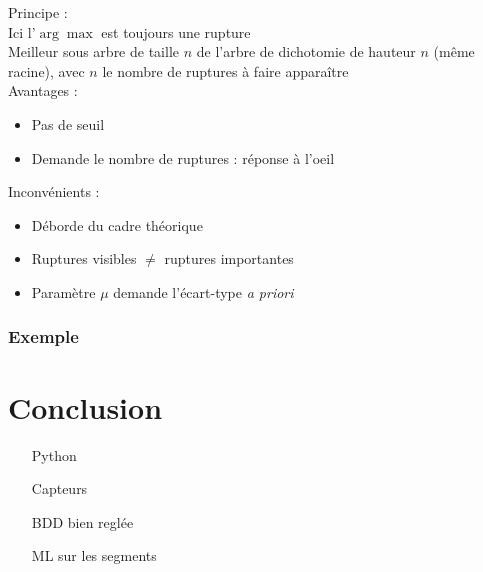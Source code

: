 \documentclass{beamer}
\begin{document}
\begin{frame}

	Principe :
	\vspace{.25cm}
	\\
	Ici l'$\arg\max$ est toujours une rupture
	\\
	Meilleur sous arbre de taille $n$ de l'arbre de dichotomie de hauteur $n$ (même racine), avec $n$ le nombre de ruptures à faire apparaître
	\\
	\phantom{caca}
	Avantages :

	\begin{itemize}
		
		\item Pas de seuil
		
		\item Demande le nombre de ruptures : réponse à l'oeil
		
	\end{itemize}

	Inconvénients :
	
	\begin{itemize}
	
		\item Déborde du cadre théorique
		
		\item Ruptures visibles $\ne$ ruptures importantes
		
		\item Paramètre $\mu$ demande l'écart-type \emph{a priori}
	
	\end{itemize}

\end{frame}

\begin{frame}
\frametitle{Exemple}
\end{frame}
\section{Conclusion}

\begin{frame}

\begin{itemize}

	\item[Python]
	
	\item[Capteurs]
	
	\item[BDD] bien reglée
	
	\item[ML] sur les segments

\end{itemize}

\end{frame}
\end{document}

